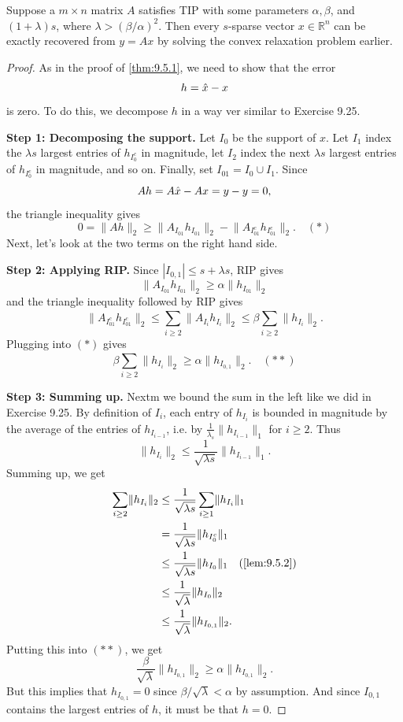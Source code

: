 \begin{theorem}
\label{thm:9.5.6}
Suppose a $m \times n$ matrix $A$ satisfies TIP with some parameters $\alpha, \beta$, and $(1 + \lambda)s$, 
where $\lambda > (\beta/\alpha)^2$. Then every $s$-sparse vector $x \in \mathbb{R}^n$ can be exactly recovered 
from $y = Ax$ by solving the convex relaxation problem earlier.
\end{theorem}

\begin{proof}
As in the proof of \cref{thm:9.5.1}, we need to show that the error
\[ h = \Hat{x} - x \]
is zero. To do this, we decompose $h$ in a way ver similar to Exercise 9.25.

\textbf{Step 1: Decomposing the support.} Let $I_0$ be the support of $x$. Let $I_1$ index the $\lambda s$ 
largest entries of $h_{I_0^c}$ in magnitude, let $I_2$ index the next $\lambda s$ largest entries of 
$h_{I_0^c}$ in magnitude, and so on. Finally, set $I_{01} = I_0 \cup I_1$. Since 
\[ Ah = A \Hat{x} - Ax = y - y = 0, \]
the triangle inequality gives 
\[ 0 = \lVert Ah \rVert_{2} \geq \lVert A_{I_{01}}h_{I_{01}} \rVert_{2} - 
\lVert A_{I_{01}^c}h_{I_{01}^c} \rVert_{2}. \quad (*) \]
Next, let's look at the two terms on the right hand side.

\textbf{Step 2: Applying RIP.} Since $|I_{0,1}| \leq s + \lambda s$, RIP gives 
\[ \lVert A_{I_{01}} h_{I_{01}} \rVert_{2} \geq \alpha \lVert h_{I_{01}} \rVert_{2} \]
and the triangle inequality followed by RIP gives 
\[ \lVert A_{I_{01}^c}h_{I_{01}^c} \rVert_{2} \leq \sum_{i \geq 2}^{} \lVert A_{I_i}h_{I_i} \rVert_{2} 
\leq \beta \sum_{i \geq 2}^{} \lVert h_{I_i} \rVert_{2}. \]
Plugging into $(*)$ gives 
\[ \beta \sum_{i \geq 2}^{}\lVert h_{I_i} \rVert_{2} \geq \alpha \lVert h_{I_{0,1}} \rVert_{2}. \quad (**) \]

\textbf{Step 3: Summing up.} Nextm we bound the sum in the left like we did in Exercise 9.25. By definition 
of $I_i$, each entry of $h_{I_i}$ is bounded in magnitude by the average of the entries of $h_{I_{i - 1}}$, 
i.e. by $\frac{1}{\lambda_s}\lVert h_{I_{i-1}} \rVert_{1}$ for $i \geq 2$. Thus 
\[ \lVert h_{I_i} \rVert_{2} \leq \frac{1}{\sqrt{\lambda s}} \lVert h_{I_{i-1}} \rVert_{1}. \]
Summing up, we get 
\begin{align*}
	\sum_{i \geq 2}^{}\lVert h_{I_i} \rVert_{2} 
	&\leq \frac{1}{\sqrt{\lambda s}}\sum_{i \geq 1}^{}\lVert h_{I_i} \rVert_{1} \\
	&= \frac{1}{\sqrt{\lambda s}} \lVert h_{I_0^c} \rVert_{1} \\
	&\leq \frac{1}{\sqrt{\lambda s}} \lVert h_{I_0} \rVert_{1} \quad \text{(\cref{lem:9.5.2})} \\
	&\leq \frac{1}{\sqrt{\lambda}} \lVert h_{I_0} \rVert_{2} \\
	&\leq \frac{1}{\sqrt{\lambda}} \lVert h_{I_{0,1}} \rVert_{2}.
\end{align*}
Putting this into $(**)$, we get 
\[ \frac{\beta}{\sqrt{\lambda}}\lVert h_{I_{0,1}} \rVert_{2} \geq \alpha \lVert h_{I_{0,1}} \rVert_{2}. \]
But this implies that $h_{I_{0,1}} = 0$ since $\beta/\sqrt{\lambda} < \alpha$ by assumption. And since 
$I_{0,1}$ contains the largest entries of $h$, it must be that $h = 0$.
\end{proof}

